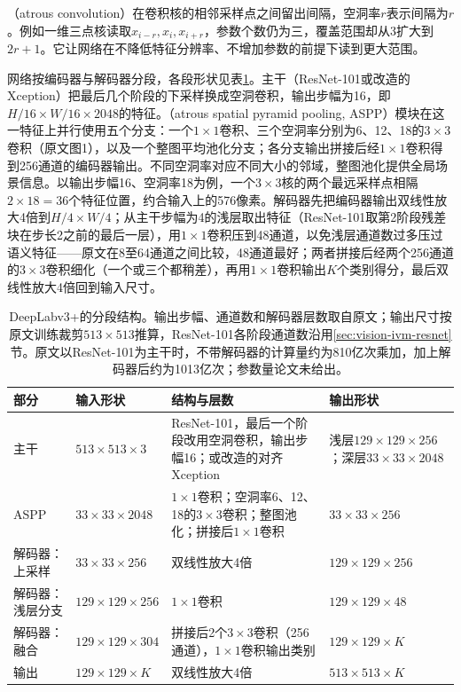 （atrous convolution）在卷积核的相邻采样点之间留出间隔，空洞率$r$表示间隔为$r$。例如一维三点核读取$x_{i-r},x_i,x_{i+r}$，参数个数仍为三，覆盖范围却从3扩大到$2r+1$。它让网络在不降低特征分辨率、不增加参数的前提下读到更大范围。

网络按编码器与解码器分段，各段形状见表\ref{tab:vision-recognition-deeplab-structure}。主干（ResNet-101或改造的Xception）把最后几个阶段的下采样换成空洞卷积，输出步幅为16，即$H/16\times W/16\times2048$的特征。（atrous spatial pyramid pooling, ASPP）模块在这一特征上并行使用五个分支：一个$1\times1$卷积、三个空洞率分别为6、12、18的$3\times3$卷积（原文图1），以及一个整图平均池化分支；各分支输出拼接后经$1\times1$卷积得到256通道的编码器输出。不同空洞率对应不同大小的邻域，整图池化提供全局场景信息。以输出步幅16、空洞率18为例，一个$3\times3$核的两个最远采样点相隔$2\times18=36$个特征位置，约合输入上的576像素。解码器先把编码器输出双线性放大4倍到$H/4\times W/4$；从主干步幅为4的浅层取出特征（ResNet-101取第2阶段残差块在步长2之前的最后一层），用$1\times1$卷积压到48通道，以免浅层通道数过多压过语义特征——原文在8至64通道之间比较，48通道最好；两者拼接后经两个256通道的$3\times3$卷积细化（一个或三个都稍差），再用$1\times1$卷积输出$K$个类别得分，最后双线性放大4倍回到输入尺寸。

\begin{table}[tbp]
 \centering
 \small
 \begin{tabularx}{\linewidth}{@{}llXl@{}}
 \toprule
 部分 & 输入形状 & 结构与层数 & 输出形状\\
 \midrule
 主干 & $513\times513\times3$ & ResNet-101，最后一个阶段改用空洞卷积，输出步幅16；或改造的对齐Xception & 浅层$129\times129\times256$；深层$33\times33\times2048$\\
 ASPP & $33\times33\times2048$ & $1\times1$卷积；空洞率6、12、18的$3\times3$卷积；整图池化；拼接后$1\times1$卷积 & $33\times33\times256$\\
 解码器：上采样 & $33\times33\times256$ & 双线性放大4倍 & $129\times129\times256$\\
 解码器：浅层分支 & $129\times129\times256$ & $1\times1$卷积 & $129\times129\times48$\\
 解码器：融合 & $129\times129\times304$ & 拼接后2个$3\times3$卷积（256通道），$1\times1$卷积输出类别 & $129\times129\times K$\\
 输出 & $129\times129\times K$ & 双线性放大4倍 & $513\times513\times K$\\
 \bottomrule
 \end{tabularx}
 \caption{DeepLabv3+的分段结构。输出步幅、通道数和解码器层数取自原文；输出尺寸按原文训练裁剪$513\times513$推算，ResNet-101各阶段通道数沿用\ref{sec:vision-ivm-resnet}节。原文以ResNet-101为主干时，不带解码器的计算量约为810亿次乘加，加上解码器后约为1013亿次；参数量论文未给出。}
 \label{tab:vision-recognition-deeplab-structure}
\end{table}

